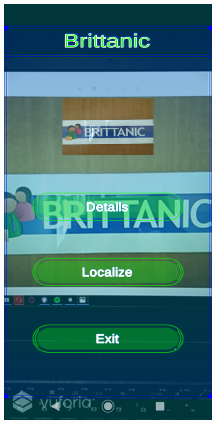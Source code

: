 \documentclass{aifyp}
\begin{document}
\begin{appendices}
\begin{figure}[H]
\begin{minipage}{.5\textwidth}
          \label{fig:InternsProcedure}
        \end{minipage}
\end{figure}
\begin{figure}[H]
    \centering
        \begin{minipage}{.5\textwidth}
          \centering
          \includegraphics[scale=0.2]{Images/Chapter5/Impl11.png}

\end{minipage}
\end{figure}
\end{appendices}
\end{document}
